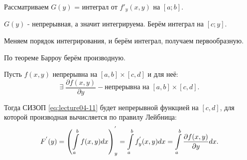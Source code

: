 \begin{col-answer-preambule}
\end{col-answer-preambule}

\begin{plan}
\item Рассматриваем $G(y)$ = интеграл от $f'_y(x, y)$ на $[a; b]$.
\item $G(y)$ - непрерывная, а значит интегрируема. Берём интеграл на $[c; y]$.
\item Меняем порядок интегрирования, и берём интеграл, получаем первообразную.
\item По теореме Барроу берём производную.
\end{plan}
\begin{theorem}
	Пусть $f(x,y)$ непрерывна на $[a,b] \times [c,d]$ и для неё:
	\begin{equation*}
	\exists \; \dfrac{\partial f(x,y)}{\partial y} - \text{непрерывна на $[a,b] \times [c,d]$}.
	\end{equation*}

	Тогда СИЗОП \eqref{eq:lecture04-11} будет непрерывной функцией на $[c,d]$, для которой производная вычисляется по правилу Лейбница:
	\begin{equation}
	\label{eq:lecture04-14}
	F^{'}(y) = \left(\displaystyle\int\limits_a^b f(x,y) dx\right)^{'}_y = \displaystyle\int\limits_a^b f^{'}_{y}(x,y)dx = \displaystyle\int\limits_a^b \dfrac{\partial f(x,y)}{\partial y} dx.
	\end{equation}
\end{theorem}
